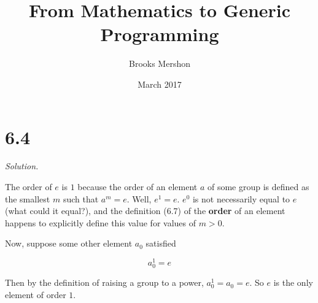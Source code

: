 \documentclass{article}
\title{From Mathematics to Generic Programming}
\author{Brooks Mershon}
\date{March 2017}
\begin{document}
\maketitle

\section*{6.4}

\textit{Solution.}

The order of $e$ is $1$ because the order of an element $a$ of some group is defined as the smallest $m$ such that $a^m = e$. Well, $e^1 = e$. $e^0$ is not necessarily equal to $e$ (what could it equal?), and the definition (6.7) of the \textbf{order} of an element happens to explicitly define this value for values of $m > 0$.

Now, suppose some other element $a_0$ satisfied

$$a_{0}^{1} = e$$

Then by the definition of raising a group to a power, $a_{0}^{1} = a_0 = e$. So $e$ is the only element of order $1$.
\end{document}
